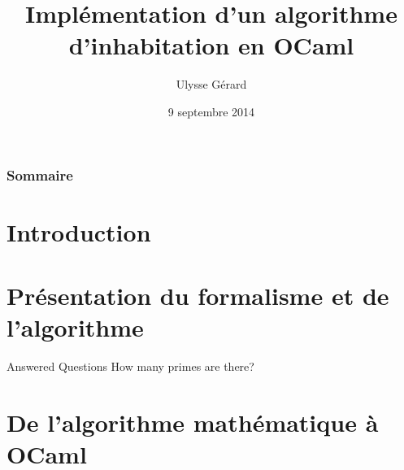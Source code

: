 \documentclass{beamer}
\title{Implémentation  d'un algorithme d'inhabitation en OCaml}
\author{Ulysse Gérard}
\institute{Université Denis Diderot, Paris 7}
\date{9 septembre 2014}
\begin{document}
    
    \begin{frame}
        \titlepage
    \end{frame}
    
    \begin{frame}
        \frametitle{Sommaire}
        \tableofcontents
    \end{frame}
    
    \section{Introduction}
    \begin{frame}
    \end{frame}
    
    \section{Présentation du formalisme et de l'algorithme}
    \begin{frame}
        \begin{block}{Answered Questions}
            How many primes are there?
        \end{block}
    \end{frame}
    
    \section{De l'algorithme mathématique à OCaml}
    \begin{frame}
    \end{frame}
    
    
\end{document}
